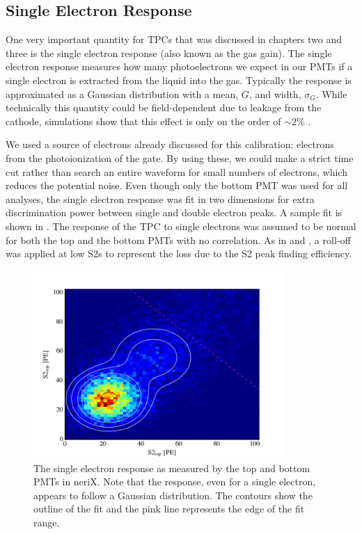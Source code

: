 \subsection{Single Electron Response}
\label{sec:nerix_gas_gain}

One very important quantity for TPCs that was discussed in chapters two and three is the single electron response (also known as the gas gain).  The single electron response measures how many photoelectrons we expect in our PMTs if a single electron is extracted from the liquid into the gas.  Typically the response is approximated as a Gaussian distribution with a mean, $G$, and width, $\sigma_G$.  While technically this quantity could be field-dependent due to leakage from the cathode, simulations show that this effect is only on the order of $\sim2\%$ \cite{goetzke2015low}.

We used a source of electrons already discussed for this calibration: electrons from the photoionization of the gate.  By using these, we could make a strict time cut rather than search an entire waveform for small numbers of electrons, which reduces the potential noise.  Even though only the bottom PMT was used for all analyses, the single electron response was fit in two dimensions for extra discrimination power between single and double electron peaks.  A sample fit is shown in .  The response of the TPC to single electrons was assumed to be normal for both the top and the bottom PMTs with no correlation.  As in  and , a roll-off was applied at low S2s to represent the loss due to the S2 peak finding efficiency.

\begin{figure}[t]
        \centering
	\includegraphics[width=0.85\textwidth]{nerix_gas_gain}
	\caption{The single electron response as measured by the top and bottom PMTs in neriX.  Note that the response, even for a single electron, appears to follow a Gaussian distribution.  The contours show the outline of the fit and the pink line represents the edge of the fit range.}
	\label{fig:nerix_gas_gain}
\end{figure}

